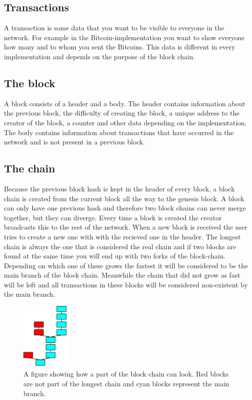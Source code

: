\documentclass[frame, english]{idamasterthesis}
\begin{document}
\subsection{Transactions}
A transaction is some data that you want to be visible to everyone in the network. For example in the Bitcoin-implementation you want to show everyone how many and to whom you sent the Bitcoins. This data is different in every implementation and depends on the purpose of the block chain.

\subsection{The block}
A block consists of a header and a body. The header contains information about the previous block, the difficulty of creating the block, a unique address to the creator of the block, a counter and other data depending on the implementation. The body contains information about transactions that have occurred in the network and is not present in a previous block.

\subsection{The chain}
Because the previous block hash is kept in the header of every block, a block chain is created from the current block all the way to the genesis block. A block can only have one previous hash and therefore two block chains can never merge together, but they can diverge. Every time a block is created the creator broadcasts this to the rest of the network. When a new block is received the user tries to create a new one with with the recieved one in the header. The longest chain is always the one that is considered the real chain and if two blocks are found at the same time you will end up with two forks of the block-chain. Depending on which one of these grows the fastest it will be considered to be the main branch of the block chain. Meanwhile the chain that did not grow as fast will be left and all transactions in these blocks will be considered non-existent by the main branch. 

\begin{figure}[h!]      %
    \centering
    \includegraphics[width = 25mm]{Pics/blockkedjan.png}
    \caption{A figure showing how a part of the block chain can look. Red blocks are not part of the longest chain and cyan blocks represent the main branch. }
    \label{fig:blockchain}
\end{figure}
\end{document}
